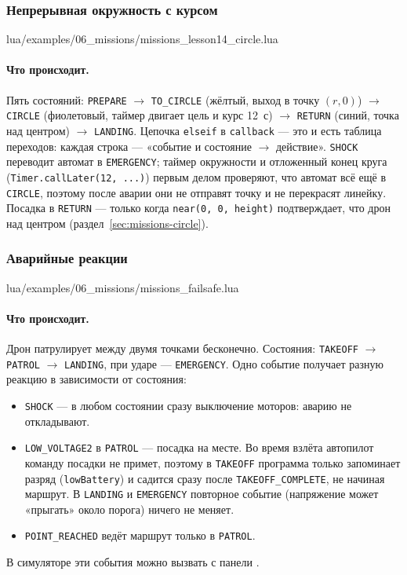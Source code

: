 \subsubsection*{Непрерывная окружность с курсом}

\begin{codefile}{lua/examples/06_missions/missions_lesson14_circle.lua}
\end{codefile}

\paragraph{Что происходит.} Пять состояний: \verb|PREPARE| $\to$ \verb|TO_CIRCLE| (жёлтый, выход в точку $(r, 0)$) $\to$ \verb|CIRCLE| (фиолетовый, таймер двигает цель и курс 12~с) $\to$ \verb|RETURN| (синий, точка над центром) $\to$ \verb|LANDING|. Цепочка \verb|elseif| в \verb|callback| --- это и есть таблица переходов: каждая строка --- «событие и состояние $\to$ действие». \verb|SHOCK| переводит автомат в \verb|EMERGENCY|; таймер окружности и отложенный конец круга (\verb|Timer.callLater(12, ...)|) первым делом проверяют, что автомат всё ещё в \verb|CIRCLE|, поэтому после аварии они не отправят точку и не перекрасят линейку. Посадка в \verb|RETURN| --- только когда \verb|near(0, 0, height)| подтверждает, что дрон над центром (раздел~\ref{sec:missions-circle}).

\subsubsection*{Аварийные реакции}

\begin{codefile}{lua/examples/06_missions/missions_failsafe.lua}
\end{codefile}

\paragraph{Что происходит.} Дрон патрулирует между двумя точками бесконечно. Состояния: \verb|TAKEOFF| $\to$ \verb|PATROL| $\to$ \verb|LANDING|, при ударе --- \verb|EMERGENCY|. Одно событие получает разную реакцию в зависимости от состояния:
\begin{itemize}
    \item \verb|SHOCK| --- в любом состоянии сразу выключение моторов: аварию не откладывают.
    \item \verb|LOW_VOLTAGE2| в \verb|PATROL| --- посадка на месте. Во время взлёта автопилот команду посадки не примет, поэтому в \verb|TAKEOFF| программа только запоминает разряд (\verb|lowBattery|) и садится сразу после \verb|TAKEOFF_COMPLETE|, не начиная маршрут. В \verb|LANDING| и \verb|EMERGENCY| повторное событие (напряжение может «прыгать» около порога) ничего не меняет.
    \item \verb|POINT_REACHED| ведёт маршрут только в \verb|PATROL|.
\end{itemize}
В симуляторе эти события можно вызвать с панели .

